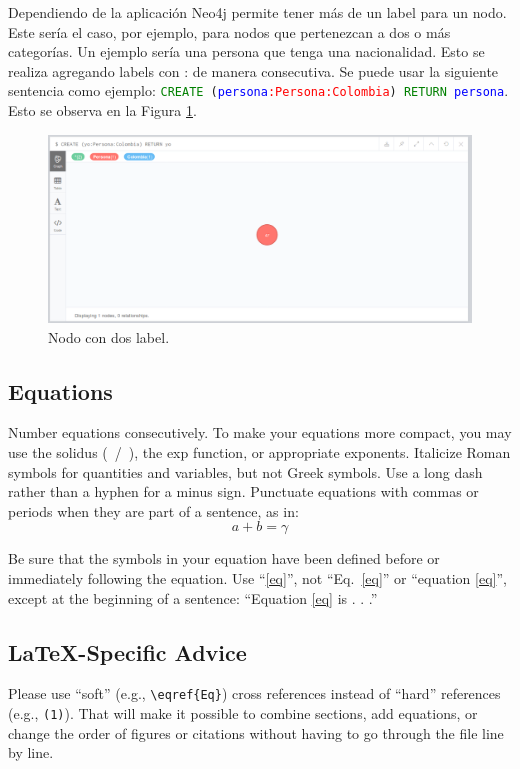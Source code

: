 \documentclass[conference]{IEEEtran}
\begin{document}
Dependiendo de la aplicación Neo4j permite tener más de un label para un nodo. Este sería el caso, por ejemplo, para nodos que pertenezcan a dos o más categorías. Un ejemplo sería una persona que tenga una nacionalidad. Esto se realiza agregando labels con : de manera consecutiva. Se puede usar la siguiente sentencia como ejemplo: \texttt{\textcolor{green}{CREATE} (\textcolor{blue}{persona}\textcolor{red}{:Persona:Colombia}) \textcolor{green}{RETURN} \textcolor{blue}{persona}}. Esto se observa en la Figura \ref{fig18}.

\begin{figure}[H]
\begin{center}
\includegraphics[width= 0.45 \textwidth]{crear_nodo_label2.png}
\end{center}
\caption{Nodo con dos label.}
\label{fig18}
\end{figure}



\subsection{Equations}
Number equations consecutively. To make your 
equations more compact, you may use the solidus (~/~), the exp function, or 
appropriate exponents. Italicize Roman symbols for quantities and variables, 
but not Greek symbols. Use a long dash rather than a hyphen for a minus 
sign. Punctuate equations with commas or periods when they are part of a 
sentence, as in:
\begin{equation}
a+b=\gamma\label{eq}
\end{equation}

Be sure that the 
symbols in your equation have been defined before or immediately following 
the equation. Use ``\eqref{eq}'', not ``Eq.~\eqref{eq}'' or ``equation \eqref{eq}'', except at 
the beginning of a sentence: ``Equation \eqref{eq} is . . .''

\subsection{\LaTeX-Specific Advice}

Please use ``soft'' (e.g., \verb|\eqref{Eq}|) cross references instead
of ``hard'' references (e.g., \verb|(1)|). That will make it possible
to combine sections, add equations, or change the order of figures or
citations without having to go through the file line by line.
\end{document}
